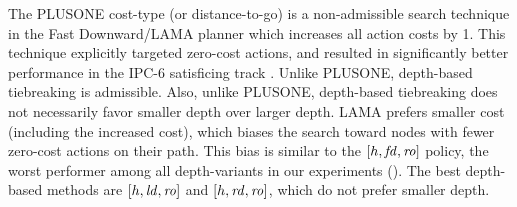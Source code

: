 The PLUSONE %
cost-type (or distance-to-go) is a non-admissible search technique in the Fast Downward/LAMA planner
\cite{richter2010lama} which increases all action costs by 1.
This technique explicitly targeted zero-cost actions,
and resulted in significantly better performance in the IPC-6
satisficing track \cite[p.137, Sec. 3.3.2]{richter2010lama}.
Unlike PLUSONE, depth-based tiebreaking is admissible.
Also, unlike PLUSONE, depth-based tiebreaking does not necessarily favor smaller depth over larger depth.
LAMA prefers smaller cost (including the increased cost),
which biases the search toward nodes with fewer zero-cost actions on their path.
This bias is similar to the $[h,{\mbox{\textit{fd}}},{\mbox{\textit{ro}}}]$ policy,
the worst performer among all depth-variants in our experiments ().
The best depth-based methods are  $[h,{\mbox{\textit{ld}}},{\mbox{\textit{ro}}}]$ and $[h,{\mbox{\textit{rd}}},{\mbox{\textit{ro}}}]$,
which do not prefer smaller depth.

